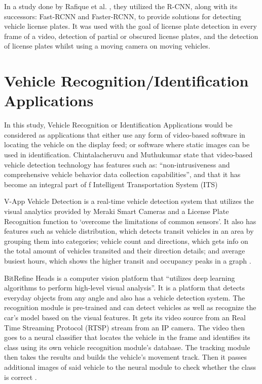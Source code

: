 In a study done by Rafique et al. \citeyear{Rafique_Pedrycz_Jeon_2017}, they utilized the R-CNN, along with its successors: Fast-RCNN and Faster-RCNN, to provide solutions for detecting vehicle license plates. It was used with the goal of license plate detection in every frame of a video, detection of partial or obscured license plates, and the detection of license plates whilst using a moving camera on moving vehicles.



\section{Vehicle Recognition/Identification Applications}
	
	In this study, Vehicle Recognition or Identification Applications would be considered as applications that either use any form of video-based software in locating the vehicle on the display feed; or software where static images can be used in identification. Chintalacheruvu and Muthukumar \citeyear{chintalacheruvu_2012} state that video-based vehicle detection technology has features such as: “non-intrusiveness and comprehensive vehicle behavior data collection capabilities”, and that it has become an integral part of f Intelligent Transportation System (ITS)

	V-App Vehicle Detection is a real-time vehicle detection system that utilizes the visual analytics provided by Meraki Smart Cameras and a License Plate Recognition function to ‘overcome the limitations of common sensors’. It also has features such as vehicle distribution, which detects transit vehicles in an area by grouping them into categories; vehicle count and directions, which gets info on the total amount of vehicles transited and their direction details; and average busiest hours, which shows the higher transit and occupancy peaks in a graph \cite{VAPP_ND}.

	BitRefine Heads is a computer vision platform that “utilizes deep learning algorithms to perform high-level visual analysis”. It is a platform that detects everyday objects from any angle and also has a vehicle detection system. The recognition module is pre-trained and can detect vehicles as well as recognize the car’s model based on the visual features. It gets its video source from an Real Time Streaming Protocol (RTSP) stream from an IP camera. The video then goes to a neural classifier that locates the vehicle in the frame and identifies its class using its own vehicle recognition module’s database.  The tracking module then takes the results and builds the vehicle’s movement track. Then it passes additional images of said vehicle to the neural module to check whether the class is correct \cite{BITREFINE_ND}.


